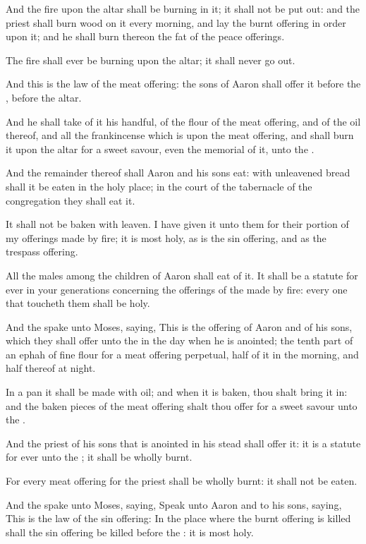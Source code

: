 \verse And the fire upon the altar shall be burning in it; it shall not be put out: and the priest shall burn wood on it every morning, and lay the burnt offering in order upon it; and he shall burn thereon the fat of the peace offerings.

\verse The fire shall ever be burning upon the altar; it shall never go out.

\verse And this is the law of the meat offering: the sons of Aaron shall offer it before the \LORD, before the altar.

\verse And he shall take of it his handful, of the flour of the meat offering, and of the oil thereof, and all the frankincense which is upon the meat offering, and shall burn it upon the altar for a sweet savour, even the memorial of it, unto the \LORD.

\verse And the remainder thereof shall Aaron and his sons eat: with unleavened bread shall it be eaten in the holy place; in the court of the tabernacle of the congregation they shall eat it.

\verse It shall not be baken with leaven. I have given it unto them for their portion of my offerings made by fire; it is most holy, as is the sin offering, and as the trespass offering.

\verse All the males among the children of Aaron shall eat of it. It shall be a statute for ever in your generations concerning the offerings of the \LORD made by fire: every one that toucheth them shall be holy.

\verse And the \LORD spake unto Moses, saying, \verse This is the offering of Aaron and of his sons, which they shall offer unto the \LORD in the day when he is anointed; the tenth part of an ephah of fine flour for a meat offering perpetual, half of it in the morning, and half thereof at night.

\verse In a pan it shall be made with oil; and when it is baken, thou shalt bring it in: and the baken pieces of the meat offering shalt thou offer for a sweet savour unto the \LORD.

\verse And the priest of his sons that is anointed in his stead shall offer it: it is a statute for ever unto the \LORD; it shall be wholly burnt.

\verse For every meat offering for the priest shall be wholly burnt: it shall not be eaten.

\verse And the \LORD spake unto Moses, saying, \verse Speak unto Aaron and to his sons, saying, This is the law of the sin offering: In the place where the burnt offering is killed shall the sin offering be killed before the \LORD: it is most holy.

